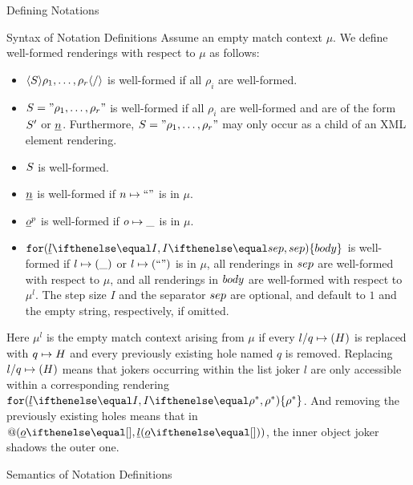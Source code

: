\begin{omgroup}[creators=miko,short={Notation and Presentation},id=pres]
\begin{omgroup}[creators={miko,frabe},id=sec:ntn-definition]{Defining Notations}
\begin{omgroup}[id=sec:nd:syntax]{Syntax of Notation Definitions}
Assume an empty match context $\mu$. We define well-formed renderings with respect to $\mu$ as follows:
\begin{itemize}
        \item $\langle S\rangle\rho_1,\ldots,\rho_r\langle/\rangle$ is well-formed if all $\rho_i$ are well-formed.
        \item $S="\rho_1,\ldots,\rho_r"$ is well-formed if all $\rho_i$ are well-formed and are of the form ${S'}$ or $\underline{n}$. Furthermore, $S="\rho_1,\ldots,\rho_r"$ may only occur as a child of an XML element rendering.
        \item ${S}$ is well-formed.
        \item $\underline{n}$ is well-formed if $n\mapsto \mbox{``''}$ is in $\mu$.
        \item $\underline{o}^{p}$ is well-formed if $o\mapsto \_$ is in $\mu$.
        \item $\PIIterate[I]{l}{\sep}{\op{body}}$ is well-formed if $l\mapsto (\_)$ or $l\mapsto (\mbox{``''})$ is in $\mu$, all renderings in $\mathop{sep}$ are well-formed with respect to $\mu$, and all renderings in $\mathop{body}$ are well-formed with respect to $\mu^l$. The step size $I$ and the separator $\mathop{sep}$ are optional, and default to $1$ and the empty string, respectively, if omitted.
\end{itemize}
Here $\mu^l$ is the empty match context arising from $\mu$ if every $l/q\mapsto (H)$
is replaced with $q\mapsto H$ and every previously existing hole named $q$ is
removed. Replacing $l/q\mapsto (H)$ means that jokers occurring within the list
joker $l$ are only accessible within a corresponding rendering
$\PIIterate[I]{l}{\rho^*}{\rho^*}$. And removing the previously existing holes means that
in $@(\JObj{o},\JLst{l}{\JObj{o}})$, the inner object joker shadows the outer one.
\end{omgroup}

\begin{omgroup}[id=sec:nd:semantics]{Semantics of Notation Definitions}%


\end{omgroup}
\end{omgroup}
\end{omgroup}
